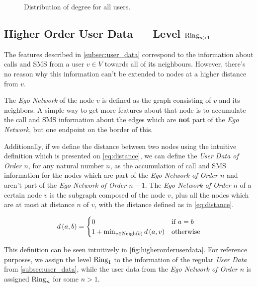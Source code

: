 \begin{figure}
\caption{Distribution of degree for all users.}
\label{fig:contacts}
\end{figure}


\subsection{Higher Order User Data --- Level $\operatorname{Ring}_{n > 1}$}

\label{subsec:higherorderuserdata}

The features described in \cref{subsec:user_data} correspond to the information about calls and SMS from a user $v \in V$ towards all of its neighbours. However, there's no reason why this information can't be extended to nodes at a higher distance from $v$.

The \emph{Ego Network} of the node $v$ is defined as the graph consisting of $v$ and its neighbors. A simple way to get more features about that node is to accumulate the call and SMS information about the edges which are \textbf{not} part of the \emph{Ego Network}, but one endpoint on the border of this.

Additionally, if we define the distance between two nodes using the intuitive definition which is presented on \cref{eq:distance}, we can define the \emph{User Data of Order $n$}, for any natural number $n$, as the accumulation of call and SMS information for the nodes which are part of the \emph{Ego Network of Order $n$} and aren't part of the \emph{Ego Network of Order $n - 1$}. The \emph{Ego Network of Order $n$} of a certain node $v$ is the subgraph composed of the node $v$, plus all the nodes which are at most at distance $n$ of $v$, with the distance defined as in \cref{eq:distance}.

\begin{equation}
d \left( a, b \right) =
\begin{cases}
	0 & \text{if } a = b \\
	1 + \min_{v \in \operatorname{Neigh} \left(b \right)} d \left( a, v \right) & \text{otherwise}
\end{cases}
\label{eq:distance}
\end{equation}

This definition can be seen intuitively in \cref{fig:higherorderuserdata}. For reference purposes, we assign the level $\operatorname{Ring}_1$ to the information of the regular \emph{User Data} from \cref{subsec:user_data}, while the user data from the \emph{Ego Network of Order $n$} is assigned $\operatorname{Ring}_n$ for some $n > 1$\footnotemark{}.

